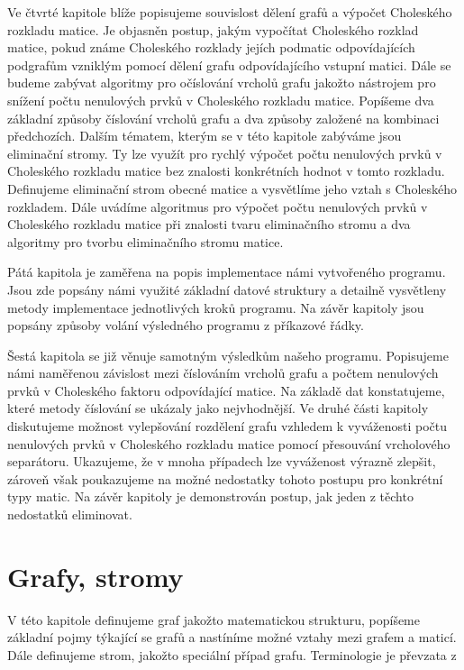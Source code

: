 \documentclass{ctuthesis}
\theoremstyle{plain}
\theoremstyle{definition}
\begin{document}
Ve čtvrté kapitole blíže popisujeme souvislost dělení grafů a výpočet Choleského rozkladu matice. Je objasněn postup, jakým vypočítat Choleského rozklad matice, pokud známe Choleského rozklady jejích podmatic odpovídajících podgrafům vzniklým pomocí dělení grafu odpovídajícího vstupní matici. Dále se budeme zabývat algoritmy pro očíslování vrcholů grafu jakožto nástrojem pro snížení počtu nenulových prvků v Choleského rozkladu matice. Popíšeme dva základní způsoby číslování vrcholů grafu a dva způsoby založené na kombinaci předchozích. Dalším tématem, kterým se v této kapitole zabýváme jsou eliminační stromy. Ty lze využít pro rychlý výpočet počtu nenulových prvků v Choleského rozkladu matice bez znalosti konkrétních hodnot v tomto rozkladu. Definujeme eliminační strom obecné matice a vysvětlíme jeho vztah s Choleského rozkladem. Dále uvádíme algoritmus pro výpočet počtu nenulových prvků v Choleského rozkladu matice při znalosti tvaru eliminačního stromu a dva algoritmy pro tvorbu eliminačního stromu matice.

Pátá kapitola je zaměřena na popis implementace námi vytvořeného programu. Jsou zde popsány námi využité základní datové struktury a detailně vysvětleny metody implementace jednotlivých kroků programu. Na závěr kapitoly jsou popsány způsoby volání výsledného programu z příkazové řádky.

Šestá kapitola se již věnuje samotným výsledkům našeho programu. Popisujeme námi naměřenou závislost mezi číslováním vrcholů grafu a počtem nenulových prvků v Choleského faktoru odpovídající matice. Na základě dat konstatujeme, které metody číslování se ukázaly jako nejvhodnější. Ve druhé části kapitoly diskutujeme možnost vylepšování rozdělení grafu vzhledem k vyváženosti počtu nenulových prvků v Choleského rozkladu matice pomocí přesouvání vrcholového separátoru. Ukazujeme, že v mnoha případech lze vyváženost výrazně zlepšit, zároveň však poukazujeme na možné nedostatky tohoto postupu pro konkrétní typy matic. Na závěr kapitoly je demonstrován postup, jak jeden z těchto nedostatků eliminovat.




\chapter{Grafy, stromy}
V této kapitole definujeme graf jakožto matematickou strukturu, popíšeme základní pojmy týkající se grafů a nastíníme možné vztahy mezi grafem a maticí. Dále definujeme strom, jakožto speciální případ grafu. Terminologie je převzata z \cite{koub:11}
\end{document}
